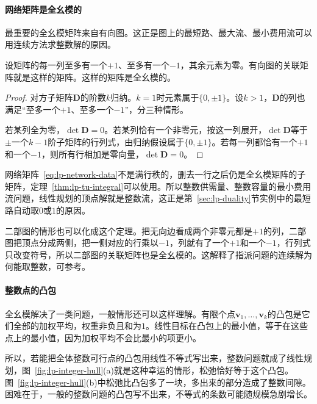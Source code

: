 \paragraph{网络矩阵是全幺模的}
最重要的全幺模矩阵来自有向图。这正是图上的最短路、最大流、最小费用流可以用连续方法求整数解的原因。

\begin{theorem}[关联矩阵全幺模]
 \label{thm:lp-incidence-tu}
 设矩阵的每一列至多有一个$+1$、至多有一个$-1$，其余元素为零。有向图的关联矩阵就是这样的矩阵。这样的矩阵是全幺模的。
\end{theorem}

\begin{proof}
 对方子矩阵$\bm{D}$的阶数$k$归纳。$k=1$时元素属于$\{0,\pm1\}$。设$k>1$，$\bm{D}$的列也满足“至多一个$+1$、至多一个$-1$”，分三种情形。

 若某列全为零，$\det\bm{D}=0$。若某列恰有一个非零元，按这一列展开，$\det\bm{D}$等于$\pm$一个$k-1$阶子矩阵的行列式，由归纳假设属于$\{0,\pm1\}$。若每一列都恰有一个$+1$和一个$-1$，则所有行相加是零向量，$\det\bm{D}=0$。
\end{proof}

网络矩阵~\eqref{eq:lp-network-data}不是满行秩的，删去一行之后仍是全幺模矩阵的子矩阵，定理~\ref{thm:lp-tu-integral}可以使用。所以整数供需量、整数容量的最小费用流问题，线性规划的顶点解就是整数流，这正是第~\ref{sec:lp-duality}节实例中的最短路自动取$0$或$1$的原因。

二部图的情形也可以化成这个定理。把无向边看成两个非零元都是$+1$的列，二部图把顶点分成两侧，把一侧对应的行乘以$-1$，列就有了一个$+1$和一个$-1$，行列式只改变符号，所以二部图的关联矩阵也是全幺模的。这解释了指派问题的连续解为何能取整数，可参考。

\paragraph{整数点的凸包}
全幺模解决了一类问题，一般情形还可以这样理解。有限个点$\bm{v}_1,\ldots,\bm{v}_k$的凸包是它们全部的加权平均，权重非负且和为$1$。线性目标在凸包上的最小值，等于在这些点上的最小值，因为加权平均不会比最小的项更小。

所以，若能把全体整数可行点的凸包用线性不等式写出来，整数问题就成了线性规划，图~\ref{fig:lp-integer-hull}(a)就是这种幸运的情形，松弛恰好等于这个凸包。图~\ref{fig:lp-integer-hull}(b)中松弛比凸包多了一块，多出来的部分造成了整数间隙。困难在于，一般的整数问题的凸包写不出来，不等式的条数可能随规模急剧增长。

